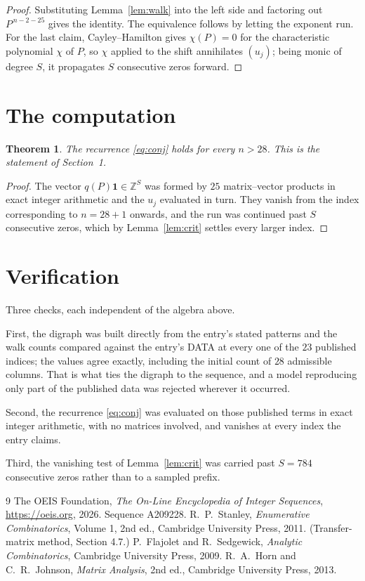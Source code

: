 \documentclass[11pt,a4paper]{article}
\theoremstyle{plain}
\newtheorem{theorem}{Theorem}
\theoremstyle{definition}
\begin{document}
\begin{proof}
Substituting Lemma~\ref{lem:walk} into the left side and factoring out
$P^{\,n-2-25}$ gives the identity. The equivalence follows by letting the exponent
run. For the last claim, Cayley--Hamilton gives $\chi(P)=0$ for the characteristic
polynomial $\chi$ of $P$, so $\chi$ applied to the shift annihilates $(u_j)$; being monic of
degree $S$, it propagates $S$ consecutive zeros forward.
\end{proof}

\section{The computation}

\begin{theorem}
The recurrence \eqref{eq:conj} holds for every $n>28$. This is the statement of
Section~1.
\end{theorem}

\begin{proof}
The vector $q(P)\mathbf{1}\in\mathbb{Z}^{S}$ was formed by $25$ matrix--vector
products in exact integer arithmetic and the $u_j$ evaluated in turn. They vanish from the
index corresponding to $n=28+1$ onwards, and the run was continued past $S$ consecutive
zeros, which by Lemma~\ref{lem:crit} settles every larger index.
\end{proof}

\section{Verification}

Three checks, each independent of the algebra above.

First, the digraph was built directly from the entry's stated patterns and the walk counts
compared against the entry's DATA at every one of the $23$ published indices; the
values agree exactly, including the initial count of $28$ admissible columns. That is
what ties the digraph to the sequence, and a model reproducing only part of the published
data was rejected wherever it occurred.

Second, the recurrence \eqref{eq:conj} was evaluated on those published terms in exact
integer arithmetic, with no matrices involved, and vanishes at every index the entry claims.

Third, the vanishing test of Lemma~\ref{lem:crit} was carried past $S=784$ consecutive
zeros rather than to a sampled prefix.

\begin{thebibliography}{9}
 The OEIS Foundation, \emph{The On-Line Encyclopedia of Integer
Sequences}, \url{https://oeis.org}, 2026. Sequence A209228.
 R.~P.~Stanley, \emph{Enumerative Combinatorics}, Volume 1, 2nd ed.,
Cambridge University Press, 2011. (Transfer-matrix method, Section 4.7.)
 P.~Flajolet and R.~Sedgewick, \emph{Analytic Combinatorics}, Cambridge
University Press, 2009.
 R.~A.~Horn and C.~R.~Johnson, \emph{Matrix Analysis}, 2nd ed., Cambridge
University Press, 2013.
\end{thebibliography}
\end{document}

